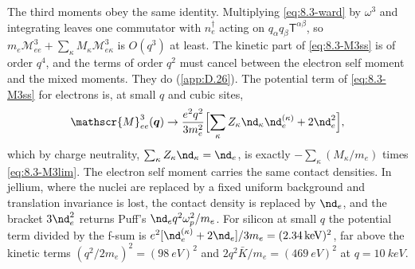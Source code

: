The third moments obey the same identity. Multiplying \cref{eq:8.3-ward} by $\omega^3$ and integrating leaves one commutator with $n_e^\dagger$ acting on $q_\alpha q_\beta\mathsf{T}^{\alpha\beta}$, so $m_e\mathscr{M}^3_{ee} + \sum_\kappa M_\kappa\mathscr{M}^3_{e\kappa}$ is $O(q^3)$ at least. The kinetic part of \cref{eq:8.3-M3ss} is of order $q^4$, and the terms of order $q^2$ must cancel between the electron self moment and the mixed moments. They do (\cref{app:D.26}). The potential term of \cref{eq:8.3-M3ss} for electrons is, at small $q$ and cubic sites,
\begin{equation}
  \mathscr{M}^3_{ee}(\vect{q}) \to \frac{e^2q^2}{3m_e^2}\Bigl[\sum_\kappa Z_\kappa\nd_\kappa\nd_e^{(\kappa)} + 2\nd_e^2\Bigr] ,
  \label{eq:8.3-M3ee}
\end{equation}
which by charge neutrality, $\sum_\kappa Z_\kappa\nd_\kappa = \nd_e$, is exactly $-\sum_\kappa(M_\kappa/m_e)$ times \cref{eq:8.3-M3lim}. The electron self moment carries the same contact densities. In jellium, where the nuclei are replaced by a fixed uniform background and translation invariance is lost, the contact density is replaced by $\nd_e$, and the bracket $3\nd_e^2$ returns Puff's $\nd_eq^2\omega_p^2/m_e$. For silicon at small $q$ the potential term divided by the f-sum is $e^2[\nd_e^{(\kappa)} + 2\nd_e]/3m_e = (\SI{2.34}{keV})^2$, far above the kinetic terms $(q^2/2m_e)^2 = (\SI{98}{eV})^2$ and $2q^2\bar K/m_e = (\SI{469}{eV})^2$ at $q = \SI{10}{keV}$.

